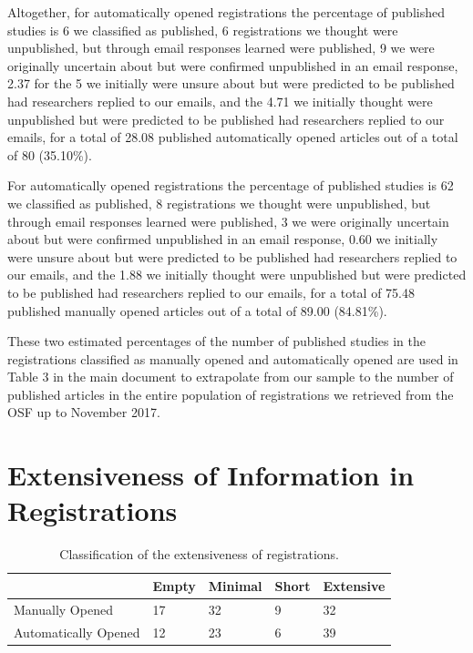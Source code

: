 \documentclass[
  ,jou, a4paper,floatsintext]{apa6}
\begin{document}
Altogether, for automatically opened registrations the percentage of published studies is 6 we classified as published, 6 registrations we thought were unpublished, but through email responses learned were published, 9 we were originally uncertain about but were confirmed unpublished in an email response, 2.37 for the 5 we initially were unsure about but were predicted to be published had researchers replied to our emails, and the 4.71 we initially thought were unpublished but were predicted to be published had researchers replied to our emails, for a total of 28.08 published automatically opened articles out of a total of 80 (35.10\%).

For automatically opened registrations the percentage of published studies is 62 we classified as published, 8 registrations we thought were unpublished, but through email responses learned were published, 3 we were originally uncertain about but were confirmed unpublished in an email response, 0.60 we initially were unsure about but were predicted to be published had researchers replied to our emails, and the 1.88 we initially thought were unpublished but were predicted to be published had researchers replied to our emails, for a total of 75.48 published manually opened articles out of a total of 89.00 (84.81\%).

These two estimated percentages of the number of published studies in the registrations classified as manually opened and automatically opened are used in Table 3 in the main document to extrapolate from our sample to the number of published articles in the entire population of registrations we retrieved from the OSF up to November 2017.

\section{Extensiveness of Information in Registrations}\label{extensiveness-of-information-in-registrations}

\begin{table}[tbp]

\begin{center}
\begin{threeparttable}

\caption{\label{tab:table-quality}Classification of the extensiveness of registrations.}

\begin{tabular}{lllll}
\toprule
 & \multicolumn{1}{c}{Empty} & \multicolumn{1}{c}{Minimal} & \multicolumn{1}{c}{Short} & \multicolumn{1}{c}{Extensive}\\
\midrule
Manually Opened & 17 & 32 & 9 & 32\\
Automatically Opened & 12 & 23 & 6 & 39\\
\bottomrule
\end{tabular}

\end{threeparttable}
\end{center}

\end{table}
\end{document}
